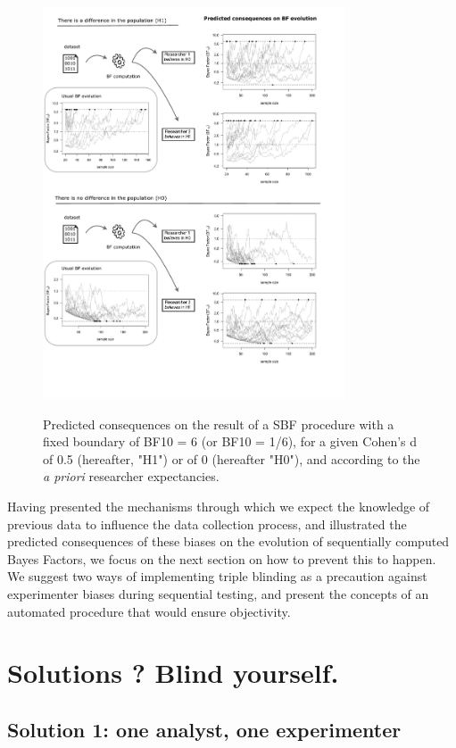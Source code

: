 \documentclass[a4paper,man,natbib,floatsintext,donotrepeattitle]{apa6}
\begin{document}
\begin{figure}[H]
  \caption{Predicted consequences on the result of a SBF procedure with a fixed boundary of BF10 = 6 (or BF10 = 1/6), for a given Cohen's d of 0.5 (hereafter, "H1") or of 0 (hereafter "H0"), and according to the \emph{a priori} researcher expectancies.}
  \centering
  \includegraphics[width=0.8\textwidth]{figures/BFF_predictions.pdf}
  \label{fig:pred}
\end{figure}

Having presented the mechanisms through which we expect the knowledge of previous data to influence the data collection process, and illustrated the predicted consequences of these biases on the evolution of sequentially computed Bayes Factors, we focus on the next section on how to prevent this to happen. We suggest two ways of implementing triple blinding as a precaution against experimenter biases during sequential testing, and present the concepts of an automated procedure that would ensure objectivity.

\section{Solutions ? Blind yourself.}

\subsection{Solution 1: one analyst, one experimenter}
\end{document}
